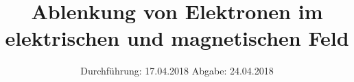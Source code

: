
\usepackage{wrapfig}
\usepackage{ dsfont }
\subject{VERSUCH 501 + 502}
\title{Ablenkung von Elektronen im elektrischen und magnetischen Feld}
\date{%
  \hspace{-2.5em}
  Durchführung: 17.04.2018
  \hspace{4em}
  Abgabe: 24.04.2018
}


  \setlength{\parindent}{0em}
  \maketitle
  \thispagestyle{empty}
  \newpage
  \tableofcontents
  \newpage





\printbibliography{}
% 


